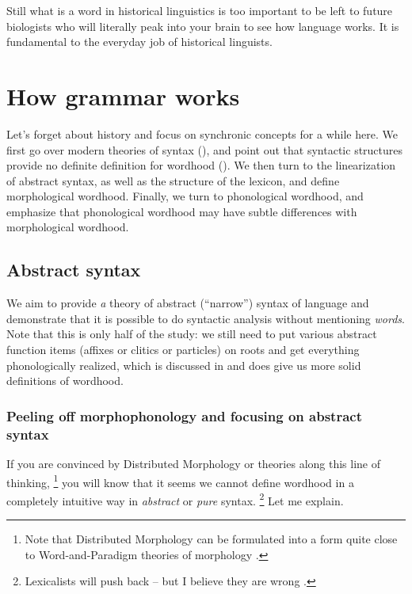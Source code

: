 \documentclass[a4paper, oneside, scheme=plain, 12pt]{article}
\newcommand*{\term}[1]{\emph{#1}}
\begin{document}
Still what is a word in historical linguistics is too important
to be left to future biologists who will literally peak into your brain to see how language works.
It is fundamental to the everyday job of historical linguists.


\section{How grammar works}\label{sec:grammar}

Let's forget about history and focus on synchronic concepts for a while here.
We first go over modern theories of syntax (),
and point out that syntactic structures provide no definite definition for wordhood
().
We then turn to the linearization of abstract syntax,
as well as the structure of the lexicon,
and define morphological wordhood.
Finally, we turn to phonological wordhood,
and emphasize that phonological wordhood may have subtle differences with morphological wordhood.

\subsection{Abstract syntax}\label{sec:abstract-syntax}

We aim to provide \emph{a} theory of abstract (``narrow'') syntax of language
and demonstrate that it is possible to do syntactic analysis without mentioning \term{words}.
Note that this is only half of the study:
we still need to put various abstract function items (affixes or clitics or particles)
on roots and get everything phonologically realized,
which is discussed in 
and does give us more solid definitions of wordhood.

\subsubsection{Peeling off morphophonology and focusing on abstract syntax}

If you are convinced by Distributed Morphology or theories along this line of thinking,%
\footnote{
    Note that Distributed Morphology can be formulated into a form quite close to Word-and-Paradigm theories of morphology \citep{ermolaeva2018distributed}.
}
you will know that it seems we cannot define wordhood in a completely intuitive way in \emph{abstract} or \emph{pure} syntax.%
\footnote{
    Lexicalists will push back -- but I believe they are wrong \citep{bruening2018lexicalist}.
}
Let me explain.
\end{document}
